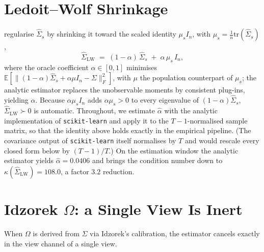 \documentclass[a4paper,11pt]{article}
\theoremstyle{plain}
\theoremstyle{definition}
\newcommand{\E}{\mathbb{E}}
\newcommand{\LW}{\mathrm{LW}}
\begin{document}
\section{Ledoit--Wolf Shrinkage}
\label{sec:lw}

\citet{LedoitWolf2004} regularise $\hat\Sigma_s$ by shrinking it toward
the scaled identity $\mu_s I_n$, with
$\mu_s = \tfrac{1}{n}\mathrm{tr}(\hat\Sigma_s)$,
\[
  \hat\Sigma_{\LW} \;=\; (1-\alpha)\,\hat\Sigma_s \;+\; \alpha\,\mu_s\,I_n,
\]
where the oracle coefficient $\alpha\in[0,1]$ minimises
$\E[\|(1-\alpha)\hat\Sigma_s + \alpha\mu I_n - \Sigma\|_F^2]$, with
$\mu$ the population counterpart of $\mu_s$; the analytic estimator
replaces the unobservable moments by consistent plug-ins, yielding
$\hat\alpha$. Because $\alpha\mu_s I_n$ adds $\alpha\mu_s>0$ to
every eigenvalue of $(1-\alpha)\hat\Sigma_s$, $\hat\Sigma_{\LW}\succ 0$
is automatic. Throughout, we estimate $\hat\alpha$ with the analytic
implementation of \texttt{scikit-learn} and apply it to the
$T-1$-normalised sample matrix, so that the identity above holds exactly
in the empirical pipeline. (The covariance output of
\texttt{scikit-learn} itself normalises by $T$ and would rescale every
closed form below by $(T-1)/T$.) On the estimation window the analytic
estimator yields $\hat\alpha = 0.0406$ and brings the condition number down
to $\kappa(\hat\Sigma_{\LW}) = 108.0$, a factor $3.2$ reduction.

\section{Idzorek $\Omega$: a Single View Is Inert}
\label{sec:idzorek-cancel}

When $\Omega$ is derived from $\Sigma$ via
Idzorek's calibration, the estimator cancels exactly in the view channel
of a single view.
\end{document}
